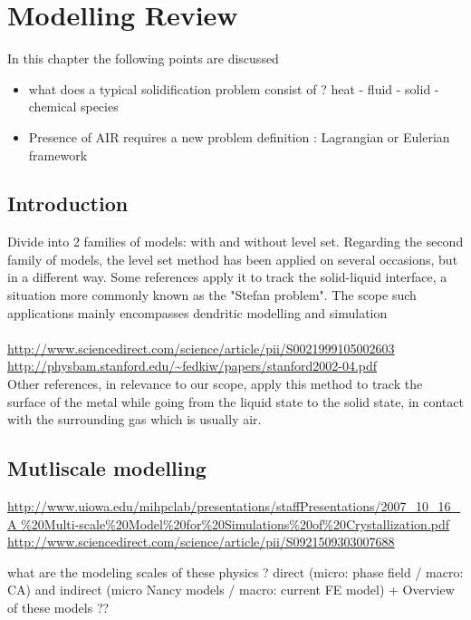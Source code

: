 \chapter{Modelling Review}
\begin{nolinkcolors} 
\minitoc
\end{nolinkcolors}
\newpage

In this chapter the following points are discussed
\begin{itemize}
\item what does a typical solidification problem consist of ? heat - fluid - solid 
- chemical species
\item Presence of AIR requires a new problem definition : Lagrangian or Eulerian framework
\end{itemize}

\section{Introduction}
Divide into 2 families of models: with and without level set. Regarding the second family of models,
the level set method has been applied on several occasions, but in a different way. Some references
apply it to track the solid-liquid interface, a situation more commonly known as the "Stefan problem".
The scope such applications mainly encompasses dendritic modelling and simulation \\
 \\
\url{http://www.sciencedirect.com/science/article/pii/S0021999105002603} \\
\url{http://physbam.stanford.edu/~fedkiw/papers/stanford2002-04.pdf} \\
Other references, in relevance to our scope, apply this method to track the surface of the metal
while going from the liquid state to the solid state, in contact with the surrounding gas which is usually air. \\

\section{Mutliscale modelling}
\url{http://www.uiowa.edu/mihpclab/presentations/staffPresentations/2007_10_16_A
} \\

\url{http://www.sciencedirect.com/science/article/pii/S0921509303007688}

what are the modeling scales of these physics ? direct (micro: phase field / macro: CA) 
and indirect (micro Nancy models / macro: current FE model) + Overview of these models ??


